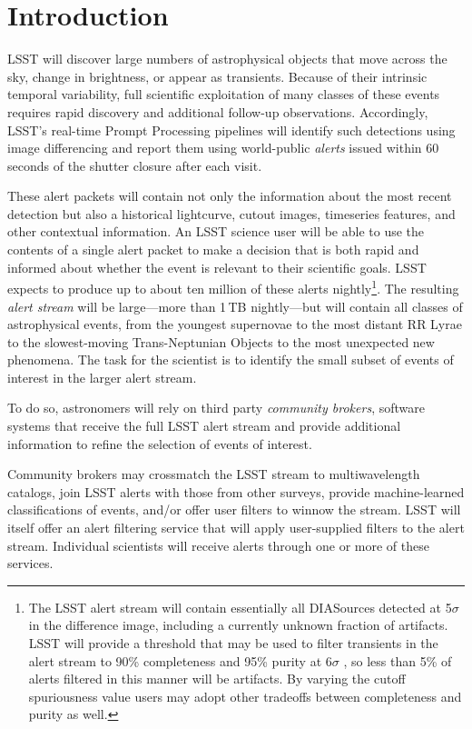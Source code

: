 \section{Introduction}\label{sec:introduction}

LSST will discover large numbers of astrophysical objects that move across the sky, change in brightness, or appear as transients.
Because of their intrinsic temporal variability, full scientific exploitation of many classes of these events requires rapid discovery and additional follow-up observations.
Accordingly, LSST's real-time Prompt Processing pipelines will identify such detections using image differencing and report them using world-public \textit{alerts} issued within 60 seconds of the shutter closure after each visit.

These alert packets will contain not only the information about the most recent detection but also a historical lightcurve, cutout images, timeseries features, and other contextual information.
An LSST science user will be able to use the contents of a single alert packet to make a decision that is both rapid and informed about whether the event is relevant to their scientific goals.
LSST expects to produce up to about ten million of these alerts nightly\footnote{The LSST alert stream will contain essentially all DIASources detected at 5$\sigma$ in the difference image, including a currently unknown fraction of artifacts. 
LSST will provide a threshold that may be used to filter transients in the alert stream to 90\% completeness and 95\% purity at 6$\sigma$ , so less than 5\% of alerts filtered in this manner will be artifacts.
By varying the cutoff spuriousness value users may adopt other tradeoffs between completeness and purity as well.}.
The resulting \textit{alert stream} will be large---more than 1\,TB nightly---but will contain all classes of astrophysical events, from the youngest supernovae to the most distant RR Lyrae to the slowest-moving Trans-Neptunian Objects to the most unexpected new phenomena.
The task for the scientist is to identify the small subset of events of interest in the larger alert stream.

To do so, astronomers will rely on third party \textit{community brokers}, software systems that receive the full LSST alert stream and provide additional information to refine the selection of events of interest.

Community brokers may crossmatch the LSST stream to multiwavelength catalogs, join LSST alerts with those from other surveys, provide machine-learned classifications of events, and/or offer user filters to winnow the stream.
LSST will itself offer an alert filtering service that will apply user-supplied filters to the alert stream.
Individual scientists will receive alerts through one or more of these services.

